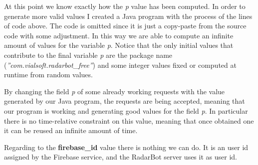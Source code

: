 			\par At this point we know exactly how the \textit{p} value has been computed. In order to generate more valid values I created a Java program with the process of the lines of code above. The code is omitted since it is just a copy-paste from the source code with some adjustment. In this way we are able to compute an infinite amount of values for the variable \textit{p}.   \newline
			Notice that the only initial values that contribute to the final variable \textit{p} are the package name (\textit{''com.vialsoft.radarbot\_free''}) and some integer values fixed or computed at runtime from random values. \newline
			\par By changing the field \textit{p} of some already working requests with the value generated by our Java program, the requests are being accepted, meaning that our program is working and generating good values for the field \textit{p}. In particular there is no time-relative constraint on this value, meaning that once obtained one it can be reused an infinite amount of time. \newline
			\par Regarding to the \textbf{firebase\_id} value there is nothing we can do. It is an user id assigned by the Firebase service, and the RadarBot server uses it as user id. 
			
